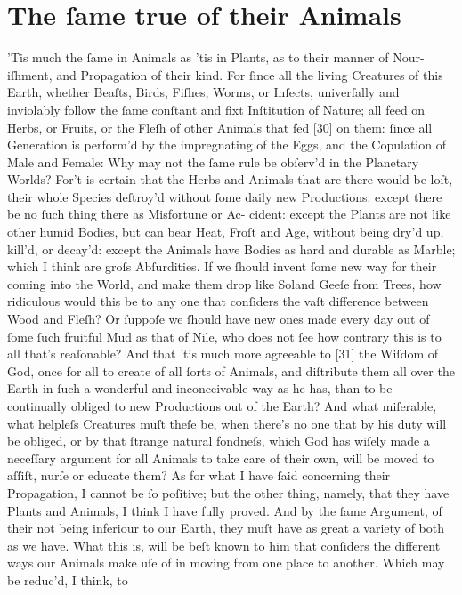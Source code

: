 \documentclass[letterpaper]{book}
\begin{document}
\section{The ſame true of their Animals}

'Tis much the ſame in Animals as 'tis in Plants, as to their manner of Nour-
iſhment, and Propagation of their kind. For ſince all the living Creatures
of this Earth, whether Beaſts, Birds, Fiſhes, Worms, or Inſects, univerſally
and inviolably follow the ſame conſtant and fixt Inſtitution of Nature; all
feed on Herbs, or Fruits, or the Fleſh of other Animals that fed [30] on
them: ſince all Generation is perform'd by the impregnating of the Eggs, and
the Copulation of Male and Female: Why may not the ſame rule be obſerv'd in
the Planetary Worlds? For't is certain that the Herbs and Animals that are
there would be loſt, their whole Species deſtroy'd without ſome daily new
Productions: except there be no ſuch thing there as Misfortune or Ac-
cident: except the Plants are not like other humid Bodies, but can bear
Heat, Froſt and Age, without being dry'd up, kill'd, or decay'd: except the
Animals have Bodies as hard and durable as Marble; which I think are groſs
Abſurdities. If we ſhould invent ſome new way for their coming into the
World, and make them drop like Soland Geeſe from Trees, how ridiculous would
this be to any one that conſiders the vaſt difference between Wood and
Fleſh? Or ſuppoſe we ſhould have new ones made every day out of ſome ſuch
fruitful Mud as that of Nile, who does not ſee how contrary this is to all
that's reaſonable? And that 'tis much more agreeable to [31] the Wiſdom of
God, once for all to create of all ſorts of Animals, and diſtribute them all
over the Earth in ſuch a wonderful and inconceivable way as he has, than to
be continually obliged to new Productions out of the Earth?  And what
miſerable, what helpleſs Creatures muſt theſe be, when there's no one that
by his duty will be obliged, or by that ſtrange natural fondneſs, which God
has wiſely made a neceſſary argument for all Animals to take care of their
own, will be moved to aſſiſt, nurſe or educate them?  As for what I have
ſaid concerning their Propagation, I cannot be ſo poſitive; but the other
thing, namely, that they have Plants and Animals, I think I have fully
proved. And by the ſame Argument, of their not being inferiour to our Earth,
they muſt have as great a variety of both as we have. What this is, will be
beſt known to him that conſiders the different ways our Animals make uſe of
in moving from one place to another. Which may be reduc'd, I think, to
\end{document}
